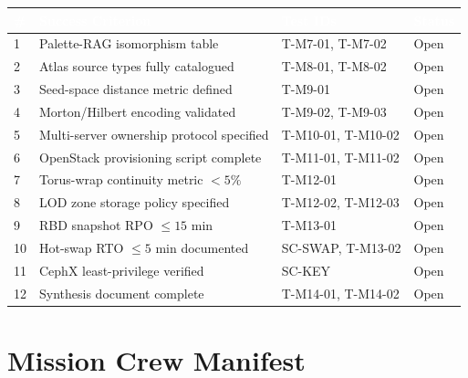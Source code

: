 \documentclass[11pt,letterpaper]{article}
\newcommand{\tableheader}[1]{\textbf{\sffamily\textcolor{white}{#1}}}
\begin{document}
\begin{center}
\begin{tabularx}{\textwidth}{C{0.5cm}XL{3cm}C{2cm}}
\toprule
{}
\tableheader{\#} & \tableheader{Success Criterion} & \tableheader{Test IDs} & \tableheader{Status} \\
 & Palette-RAG isomorphism table & T-M7-01, T-M7-02 & Open \\
2 & Atlas source types fully catalogued & T-M8-01, T-M8-02 & Open \\
3 & Seed-space distance metric defined & T-M9-01 & Open \\
4 & Morton/Hilbert encoding validated & T-M9-02, T-M9-03 & Open \\
5 & Multi-server ownership protocol specified & T-M10-01, T-M10-02 & Open \\
6 & OpenStack provisioning script complete & T-M11-01, T-M11-02 & Open \\
7 & Torus-wrap continuity metric $<5\%$ & T-M12-01 & Open \\
8 & LOD zone storage policy specified & T-M12-02, T-M12-03 & Open \\
9 & RBD snapshot RPO $\leq 15$ min & T-M13-01 & Open \\
10 & Hot-swap RTO $\leq 5$ min documented & SC-SWAP, T-M13-02 & Open \\
11 & CephX least-privilege verified & SC-KEY & Open \\
12 & Synthesis document complete & T-M14-01, T-M14-02 & Open \\
\bottomrule
\end{tabularx}
\end{center}

\section{Mission Crew Manifest}
\end{document}
